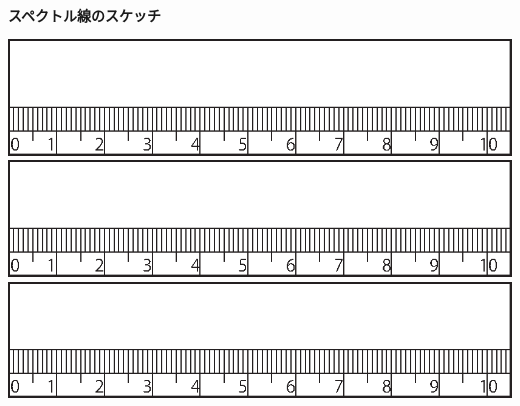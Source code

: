\\
{\bf スペクトル線のスケッチ}
\begin{center}
\hspace*{1cm}
\includegraphics{12_Spectrum/scale.eps}\\
\vspace{0.5cm}
\hspace*{1cm}
\includegraphics{12_Spectrum/scale.eps}\\
\vspace{0.5cm}
\hspace*{1cm}
\includegraphics{12_Spectrum/scale.eps}
\end{center}


